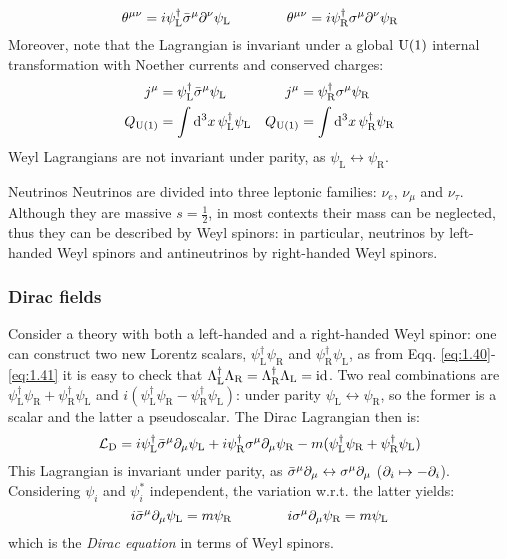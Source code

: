 \begin{equation}
  \theta^{\mu \nu} = i \psi_\text{L}^\dagger \bar{\sigma}^\mu \partial^\nu \psi_\text{L}
  \qquad \qquad
  \theta^{\mu \nu} = i \psi_\text{R}^\dagger \sigma^\mu \partial^\nu \psi_\text{R}
  \label{eq:1.86}
\end{equation}
Moreover, note that the Lagrangian is invariant under a global $ \mathrm{U}(1) $ internal transformation with Noether currents and conserved charges:
\begin{align*}
  j^\mu &= \psi_\text{L}^\dagger \bar{\sigma}^\mu \psi_\text{L} & j^\mu &= \psi_\text{R}^\dagger \sigma^\mu \psi_\text{R} \\
  Q_{\mathrm{U}(1)} &= \int \mathrm{d}^3x\, \psi_\text{L}^\dagger \psi_\text{L} & Q_{\mathrm{U}(1)} &= \int \mathrm{d}^3x\, \psi_\text{R}^\dagger \psi_\text{R}
\end{align*}
Weyl Lagrangians are not invariant under parity, as $ \psi_\text{L} \leftrightarrow \psi_\text{R} $.

\begin{example}{Neutrinos}{}
  Neutrinos are divided into three leptonic families: $ \nu_e $, $ \nu_\mu $ and $ \nu_\tau $. Although they are massive $ s = \frac{1}{2} $, in most contexts their mass can be neglected, thus they can be described by Weyl spinors: in particular, neutrinos by left-handed Weyl spinors and antineutrinos by right-handed Weyl spinors.
\end{example}

\subsubsection{Dirac fields}

Consider a theory with both a left-handed and a right-handed Weyl spinor: one can construct two new Lorentz scalars, $ \psi_\text{L}^\dagger \psi_\text{R} $ and $ \psi_\text{R}^\dagger \psi_\text{L} $, as from Eqq. \ref{eq:1.40}-\ref{eq:1.41} it is easy to check that $ \Lambda_\text{L}^\dagger \Lambda_\text{R} = \Lambda_\text{R}^\dagger \Lambda_\text{L} = \operatorname{id} $. Two real combinations are $ \psi_\text{L}^\dagger \psi_\text{R} + \psi_\text{R}^\dagger \psi_\text{L} $ and $ i (\psi_\text{L}^\dagger \psi_\text{R} - \psi_\text{R}^\dagger \psi_\text{L}) $: under parity $ \psi_\text{L} \leftrightarrow \psi_\text{R} $, so the former is a scalar and the latter a pseudoscalar. The Dirac Lagrangian then is:
\begin{equation}
  \mathcal{L}_\text{D} = i \psi_\text{L}^\dagger \bar{\sigma}^\mu \partial_\mu \psi_\text{L} + i \psi_\text{R}^\dagger \sigma^\mu \partial_\mu \psi_\text{R} - m ( \psi_\text{L}^\dagger \psi_\text{R} + \psi_\text{R}^\dagger \psi_\text{L} )
  \label{eq:1.87}
\end{equation}
This Lagrangian is invariant under parity, as $ \bar{\sigma}^\mu \partial_\mu \leftrightarrow \sigma^\mu \partial_\mu $ ($ \partial_i \mapsto - \partial_i $). Considering $ \psi_i $ and $ \psi_i^* $ independent, the variation w.r.t. the latter yields:
\begin{equation}
  i \bar{\sigma}^\mu \partial_\mu \psi_\text{L} = m \psi_\text{R}
  \qquad \qquad
  i \sigma^\mu \partial_\mu \psi_\text{R} = m \psi_\text{L}
  \label{eq:1.88}
\end{equation}
which is the \textit{Dirac equation} in terms of Weyl spinors.

